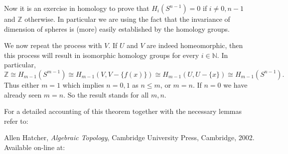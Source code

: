 \documentclass[12pt]{article}
\begin{document}
Now it is an exercise in homology to prove that $H_i(S^{n-1})=0$ if $i\neq 0,n-1$ and $\mathbb{Z}$ otherwise.  In particular we are using the fact that the invariance of dimension of spheres is (more) easily established by the homology groups.  

We now repeat the process with $V$.  If $U$ and $V$ are indeed homeomorphic, then this process will result in isomorphic homology groups for every $i\in\mathbb{N}$.  In particular, 
\[\mathbb{Z}\cong H_{m-1}(S^{m-1})\cong H_{m-1}(V,V-\{f(x)\})\cong H_{m-1}(U,U-\{x\})\cong H_{m-1}(S^{n-1}).\]
Thus either $m=1$ which implies $n=0,1$ as $n\leq m$, or $m=n$.  If $n=0$ we have already seen $m=n$.  So the result stands for all $m,n$.


For a detailed accounting of this theorem together with the necessary lemmas refer to:

\noindent Allen Hatcher, \emph{Algebraic Topology}, Cambridge University Press, Cambridge, 2002.  Available on-line at: 
\end{document}
